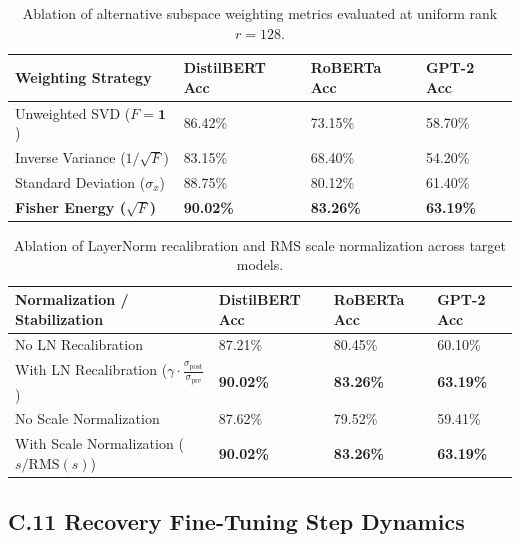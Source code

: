 \begin{table}[H]
\centering
\small
\begin{tabular}{llll}
\toprule
\textbf{Weighting Strategy} & \textbf{DistilBERT Acc} & \textbf{RoBERTa Acc} & \textbf{GPT-2 Acc} \\
\midrule
Unweighted SVD ($F = \mathbf{1}$) & 86.42\% & 73.15\% & 58.70\% \\
Inverse Variance ($1 / \sqrt{F}$) & 83.15\% & 68.40\% & 54.20\% \\
Standard Deviation ($\sigma_x$)   & 88.75\% & 80.12\% & 61.40\% \\
\textbf{Fisher Energy ($\sqrt{F}$)} & \textbf{90.02\%} & \textbf{83.26\%} & \textbf{63.19\%} \\
\bottomrule
\end{tabular}
\caption{Ablation of alternative subspace weighting metrics evaluated at uniform rank $r=128$.}
\label{tab:app_weighting_ablation}
\end{table}

\begin{table}[H]
\centering
\small
\begin{tabular}{llll}
\toprule
\textbf{Normalization / Stabilization} & \textbf{DistilBERT Acc} & \textbf{RoBERTa Acc} & \textbf{GPT-2 Acc} \\
\midrule
No LN Recalibration & 87.21\% & 80.45\% & 60.10\% \\
With LN Recalibration ($\gamma \cdot \frac{\sigma_\text{post}}{\sigma_\text{pre}}$) & \textbf{90.02\%} & \textbf{83.26\%} & \textbf{63.19\%} \\
No Scale Normalization & 87.62\% & 79.52\% & 59.41\% \\
With Scale Normalization ($s / \mathrm{RMS}(s)$) & \textbf{90.02\%} & \textbf{83.26\%} & \textbf{63.19\%} \\
\bottomrule
\end{tabular}
\caption{Ablation of LayerNorm recalibration and RMS scale normalization across target models.}
\label{tab:app_stabilization_ablation}
\end{table}

\subsection{C.11 Recovery Fine-Tuning Step Dynamics}
\label{sec:app_recovery_steps}

